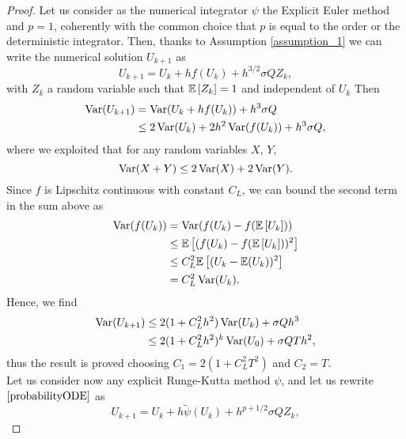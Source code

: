\begin{proof} Let us consider as the numerical integrator $\psi$ the Explicit Euler method and $p = 1$, coherently with the common choice that $p$ is equal to the order or the deterministic integrator. Then, thanks to Assumption \ref{assumption_1} we can write the numerical solution $U_{k+1}$ as
\begin{equation}
	U_{k+1} = U_k + hf(U_k) + h^{3/2}\sigma Q Z_k,
\end{equation}
with $Z_k$ a random variable such that $\mathbb{E}\left[Z_k\right] = 1$ and independent of $U_k$ Then
\begin{equation}
\begin{aligned}
	\operatorname{Var}(U_{k+1}) &= \operatorname{Var}(U_k + hf(U_k)) + h^3\sigma Q \\
	&\leq 2\operatorname{Var}(U_k) + 2h^2 \operatorname{Var}(f(U_k)) + h^3\sigma Q,
\end{aligned}
\end{equation}
where we exploited that for any random variables $X$, $Y$,
\begin{equation}\label{eq:varProp}
\operatorname{Var}(X + Y) \leq 2\operatorname{Var}(X) + 2\operatorname{Var}(Y).
\end{equation}
Since $f$ is Lipschitz continuous with constant $C_L$, we can bound the second term in the sum above as
\begin{equation}\label{eq:lipschitzVar}
\begin{aligned}
\operatorname{Var}(f(U_k)) &= \operatorname{Var}(f(U_k) - f(\mathbb{E}\left[U_k\right])) \\
&\leq \mathbb{E}\left[(f(U_k) - f(\mathbb{E}\left[U_k\right]))^2\right] \\
&\leq C_L^2\mathbb{E}\left[(U_k - \mathbb{E}(U_k))^2\right] \\
&= C_L^2 \operatorname{Var}(U_k).
\end{aligned}
\end{equation}
Hence, we find
\begin{equation}
\begin{aligned}
 \operatorname{Var}(U_{k+1}) &\leq 2(1 + C_L^2h^2)\operatorname{Var}(U_k) + \sigma Q h^3 \\
 &\leq 2(1 + C_L^2h^2)^k\operatorname{Var}(U_0) + \sigma Q Th^2,\\
\end{aligned}
\end{equation}
thus the result is proved choosing $C_1 = 2(1 + C_L^2T^2)$ and $C_2 = T$. \\
Let us consider now any explicit Runge-Kutta method $\psi$, and let us rewrite $\eqref{probabilityODE}$ as
\begin{equation}
	U_{k+1} = U_k + h\tilde \psi (U_k) + h^{p + 1/2} \sigma Q Z_k,

\end{equation}
\end{proof}
